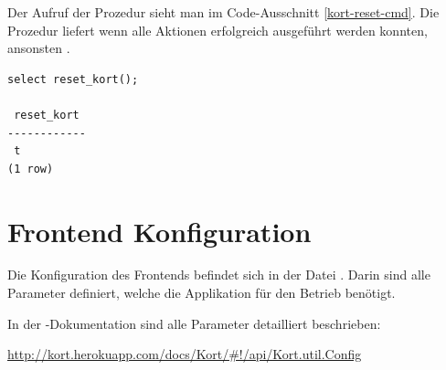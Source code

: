 Der Aufruf der Prozedur sieht man im Code-Ausschnitt \ref{kort-reset-cmd}.
Die Prozedur liefert  wenn alle Aktionen erfolgreich ausgeführt werden konnten, ansonsten .
\begin{lstlisting}[float, caption=Aufruf von reset\_kort(){,} um die Applikation zurückzusetzen, label=kort-reset-cmd]
select reset_kort();

 reset_kort 
------------
 t
(1 row)
\end{lstlisting}

\section{Frontend Konfiguration}
\label{frontend-config}
Die Konfiguration des Frontends befindet sich in der Datei .
Darin sind alle Parameter definiert, welche die Applikation für den Betrieb benötigt.

In der \kort{}-Dokumentation sind alle Parameter detailliert beschrieben:

\url{http://kort.herokuapp.com/docs/Kort/#!/api/Kort.util.Config}